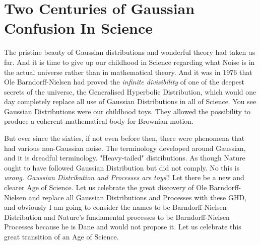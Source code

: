 \documentclass{amsart}
\begin{document}
\section{Two Centuries of Gaussian Confusion In Science}

The pristine beauty of Gaussian distributions and wonderful theory had taken us far.  And it is time to give up our childhood in Science regarding what Noise is in the actual universe rather than in mathematical theory.  And it was in 1976 that Ole Barndorff-Nielsen had proved the {\em infinite divisibility} of one of the deepest secrets of the universe, the Generalised Hyperbolic Distribution, which would one day completely replace all use of Gaussian Distributions in all of Science.  You see Gaussian Distributions were our childhood toys.  They allowed the possibility to produce a coherent mathematical body for Brownian motion.  

But ever since the sixties, if not even before then, there were phenomena that had various non-Gaussian noise.  The terminology developed around Gaussian, and it is dreadful terminology.  "Heavy-tailed" distributions.  As though Nature ought to have followed Gaussian Distribution but did not comply. No this is {\em wrong}.  {\em Gaussian Distribution and Processes are toys}!!  Let there be a new and clearer Age of Science.  Let us celebrate the great discovery of Ole Barndorff-Nielsen and replace all Gaussian Distributions and Processes with these GHD, and obviously I am going to consider the names to be Barndorff-Nielsen Distribution and Nature's fundamental processes to be Barndorff-Nielsen Processes because he is Dane and would not propose it.  Let us celebrate this great transition of an Age of Science.
\end{document}
